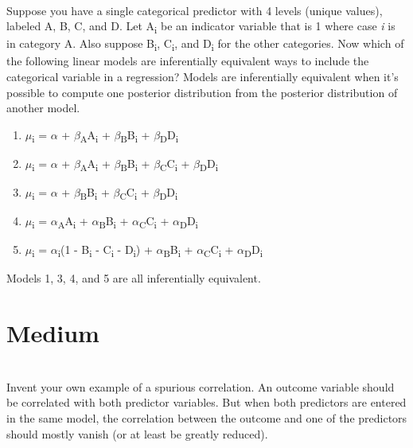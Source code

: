 \documentclass[12pt]{article}\usepackage[]{graphicx}\usepackage[]{color}
\newenvironment{problem}[2][Problem]{\begin{trivlist}
\item[\hskip \labelsep {\bfseries #1}\hskip \labelsep {\bfseries #2.}]}{\end{trivlist}}
\begin{document}
\begin{problem}{5E4}
\text{ }\\
Suppose you have a single categorical predictor with 4 levels (unique values), labeled A, B, C, and D. Let A\textsubscript{i} be an indicator variable that is 1 where case \textit{i} is in category A. Also suppose B\textsubscript{i}, C\textsubscript{i}, and D\textsubscript{i} for the other categories. Now which of the following linear models are inferentially equivalent ways to include the categorical variable in a regression? Models are inferentially equivalent when it's possible to compute one posterior distribution from the posterior distribution of another model.
\begin{enumerate}
	\item $\mu$\textsubscript{i} = $\alpha$ + $\beta$\textsubscript{A}A\textsubscript{i} + $\beta$\textsubscript{B}B\textsubscript{i} + $\beta$\textsubscript{D}D\textsubscript{i}
	\item $\mu$\textsubscript{i} = $\alpha$ + $\beta$\textsubscript{A}A\textsubscript{i} + $\beta$\textsubscript{B}B\textsubscript{i} + $\beta$\textsubscript{C}C\textsubscript{i} + $\beta$\textsubscript{D}D\textsubscript{i}
	\item $\mu$\textsubscript{i} = $\alpha$ + $\beta$\textsubscript{B}B\textsubscript{i} + $\beta$\textsubscript{C}C\textsubscript{i} + $\beta$\textsubscript{D}D\textsubscript{i}
	\item $\mu$\textsubscript{i} = $\alpha$\textsubscript{A}A\textsubscript{i} + $\alpha$\textsubscript{B}B\textsubscript{i} + $\alpha$\textsubscript{C}C\textsubscript{i} + $\alpha$\textsubscript{D}D\textsubscript{i}
	\item $\mu$\textsubscript{i} = $\alpha$\textsubscript{i}(1 - B\textsubscript{i} - C\textsubscript{i} - D\textsubscript{i}) + $\alpha$\textsubscript{B}B\textsubscript{i} + $\alpha$\textsubscript{C}C\textsubscript{i} + $\alpha$\textsubscript{D}D\textsubscript{i}
\end{enumerate}
\end{problem}

Models 1, 3, 4, and 5 are all inferentially equivalent.

\section{Medium}

\begin{problem}{5M1}
\text{ }\\
Invent your own example of a spurious correlation. An outcome variable should be correlated with both predictor variables. But when both predictors are entered in the same model, the correlation between the outcome and one of the predictors should mostly vanish (or at least be greatly reduced).
\end{problem}
\end{document}
